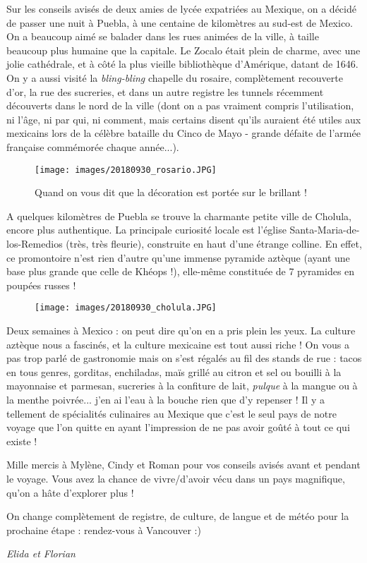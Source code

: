 Sur les conseils avisés de deux amies de lycée expatriées au Mexique, on
a décidé de passer une nuit à Puebla, à une centaine de kilomètres au
sud-est de Mexico. On a beaucoup aimé se balader dans les rues animées
de la ville, à taille beaucoup plus humaine que la capitale. Le Zocalo
était plein de charme, avec une jolie cathédrale, et à côté la plus
vieille bibliothèque d'Amérique, datant de 1646. On y a aussi visité la
\emph{bling-bling} chapelle du rosaire, complètement recouverte d'or, la
rue des sucreries, et dans un autre registre les tunnels récemment
découverts dans le nord de la ville (dont on a pas vraiment compris
l'utilisation, ni l'âge, ni par qui, ni comment, mais certains disent
qu'ils auraient été utiles aux mexicains lors de la célèbre bataille du
Cinco de Mayo - grande défaite de l'armée française commémorée chaque
année...).

\begin{figure}
\centering
\texttt{[image: images/20180930\_rosario.JPG]}
\caption{Quand on vous dit que la décoration est portée sur le brillant
!}
\end{figure}

A quelques kilomètres de Puebla se trouve la charmante petite ville de
Cholula, encore plus authentique. La principale curiosité locale est
l'église Santa-Maria-de-los-Remedios (très, très fleurie), construite en
haut d'une étrange colline. En effet, ce promontoire n'est rien d'autre
qu'une immense pyramide aztèque (ayant une base plus grande que celle de
Khéops !), elle-même constituée de 7 pyramides en poupées russes !

\begin{figure}
\centering
\texttt{[image: images/20180930\_cholula.JPG]}
\caption{}
\end{figure}

Deux semaines à Mexico : on peut dire qu'on en a pris plein les yeux. La
culture aztèque nous a fascinés, et la culture mexicaine est tout aussi
riche ! On vous a pas trop parlé de gastronomie mais on s'est régalés au
fil des stands de rue : tacos en tous genres, gorditas, enchiladas, maïs
grillé au citron et sel ou bouilli à la mayonnaise et parmesan,
sucreries à la confiture de lait, \emph{pulque} à la mangue ou à la
menthe poivrée... j'en ai l'eau à la bouche rien que d'y repenser ! Il y
a tellement de spécialités culinaires au Mexique que c'est le seul pays
de notre voyage que l'on quitte en ayant l'impression de ne pas avoir
goûté à tout ce qui existe !

Mille mercis à Mylène, Cindy et Roman pour vos conseils avisés avant et
pendant le voyage. Vous avez la chance de vivre/d'avoir vécu dans un
pays magnifique, qu'on a hâte d'explorer plus !

On change complètement de registre, de culture, de langue et de météo
pour la prochaine étape : rendez-vous à Vancouver :)

\emph{Elida et Florian}
